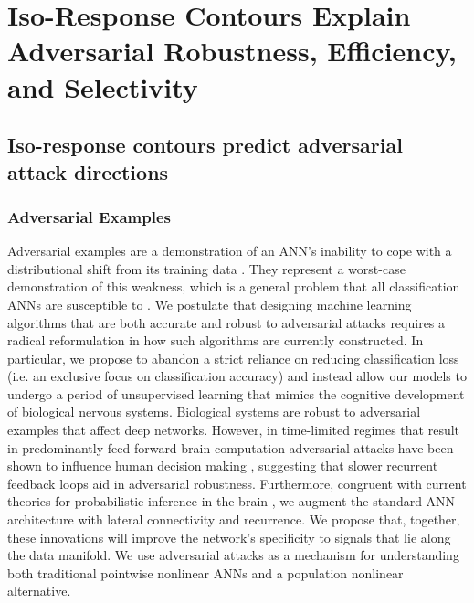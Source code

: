 \chapter{Iso-Response Contours Explain Adversarial Robustness, Efficiency, and Selectivity}

\section{Iso-response contours predict adversarial attack directions}\label{sec:ch4_adv_defense}
\subsection{Adversarial Examples}
Adversarial examples are a demonstration of an ANN’s inability to cope with a distributional shift from its training data \parencite{ford2019adversarial}. They represent a worst-case demonstration of this weakness, which is a general problem that all classification ANNs are susceptible to \parencite{hendrycks2018benchmarking}. We postulate that designing machine learning algorithms that are both accurate and robust to adversarial attacks requires a radical reformulation in how such algorithms are currently constructed. In particular, we propose to abandon a strict reliance on reducing classification loss (i.e. an exclusive focus on classification accuracy) and instead allow our models to undergo a period of unsupervised learning that mimics the cognitive development of biological nervous systems. Biological systems are robust to adversarial examples that affect deep networks. However, in time-limited regimes that result in predominantly feed-forward brain computation adversarial attacks have been shown to influence human decision making \parencite{elsayed2018adversarial}, suggesting that slower recurrent feedback loops aid in adversarial robustness. Furthermore, congruent with current theories for probabilistic inference in the brain \parencite{lee2003hierarchical}, we augment the standard ANN architecture with lateral connectivity and recurrence. We propose that, together, these innovations will improve the network’s specificity to signals that lie along the data manifold. We use adversarial attacks as a mechanism for understanding both traditional pointwise nonlinear ANNs and a population nonlinear alternative.

